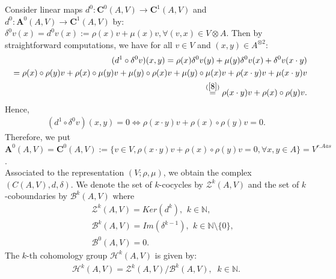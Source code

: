 \documentclass[12pt]{amsart}
\begin{document}
	Consider linear maps $ d^0: \mathbf{C}^{0}(A,V)\rightarrow \mathbf{C}^{1}(A,V)$ and  $ d^0: \mathbf{A}^{0}(A,V)\rightarrow \mathbf{C}^{1}(A,V)$ by: \\
	$	\delta^{0}v(x)=d^{0}v(x):=\rho(x)v+\mu(x)v,  \forall (v,x)\in V\otimes A.$
	Then by straightforward computations, we have for all $v\in V$ and $(x,y)\in A^{\otimes 2}$:
	\begin{eqnarray}
		&&(d^{1}\circ \delta^{0}v)(x,y)=\rho(x)\delta^{0}v(y)+\mu(y)\delta^{0}v(x)+\delta^{0}v(x\cdot y)\nonumber\\
		&&=\rho(x)\circ\rho(y)v+\rho(x)\circ\mu(y)v+\mu(y)\circ\rho(x)v+\mu(y)\circ\mu(x)v+\rho(x\cdot y)v+\mu(x\cdot y)v\nonumber\\
		&&\overset{(\ref{8})}{=}\rho(x\cdot y)v+\rho(x)\circ\rho(y)v.\nonumber
	\end{eqnarray} 
	Hence, 
	\begin{eqnarray}
		(d^{1}\circ \delta^{0}v)(x,y)=0 \Longleftrightarrow \rho(x\cdot y)v+\rho(x)\circ\rho(y)v=0.
	\end{eqnarray}
	Therefore, we put $ \mathbf{A}^{0}(A,V)=\mathbf{C}^{0}(A,V):=\{v\in V,\rho(x\cdot y)v+\rho(x)\circ\rho(y)v=0 
	,\forall x,y\in A\}=V^{r.Aas}$.\\
	
	Associated to the representation $ (V;\rho,\mu) $, we obtain the complex $ (C(A,V),d,\delta) $. We denote the set of $k$-cocycles by $ \mathcal{Z}^{k}(A,V)$ and the set of  $k$-coboundaries by $ \mathcal{B}^{k}(A,V) $  where
	\begin{eqnarray}
		&& \mathcal{Z}^{k}(A,V)=Ker(d^{k}) \label{18}, \,\ k\in\mathbb{N},\\ 
		&& \mathcal{B}^{k}(A,V)=Im(\delta^{k-1}),\,\ k\in\mathbb{N}\setminus\{0\}\label{18'},\\
		&&\mathcal{B}^{0}(A,V)=0.\label{18"}
	\end{eqnarray}
	The $k$-th cohomology group $\mathcal{H}^{k}(A,V)$ is given by:
	\begin{eqnarray}
		\label{10}
		\mathcal{H}^{k}(A,V)=\mathcal{Z}^{k}(A,V)/\mathcal{B}^{k}(A,V) ,\,\,\ k\in\mathbb{N}.
	\end{eqnarray}
\end{document}
